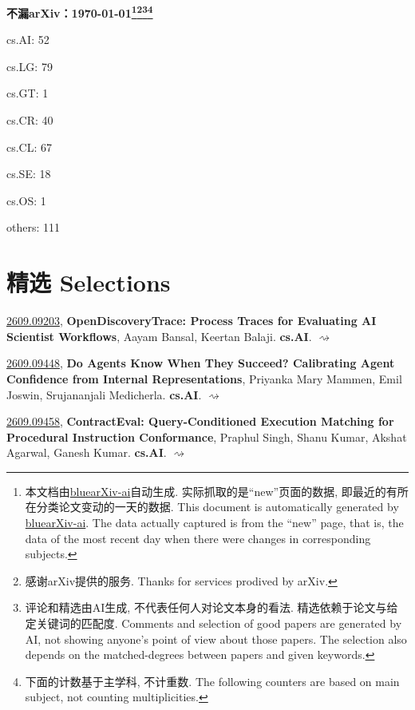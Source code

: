 \documentclass[9pt, a4paper]{article}
\theoremstyle{plain}
\theoremstyle{definition}
\theoremstyle{remark}
\newcommand{\arxiv}[3]{\href{https://arxiv.org/abs/#1}{#1}, \textbf{\textcolor{arxivblue}{#2}}, #3. }
\begin{document}
\begin{center}
    \Huge\textbf{不漏arXiv：\today \footnote{本文档由\href{https://github.com/vegetablefj/bluearXiv-ai}{bluearXiv-ai}自动生成. 实际抓取的是``new''页面的数据, 即最近的有所在分类论文变动的一天的数据. This document is automatically generated by \href{https://github.com/vegetablefj/bluearXiv-ai}{bluearXiv-ai}. The data actually captured is from the ``new'' page, that is, the data of the most recent day when there were changes in corresponding subjects.}\footnote{感谢arXiv提供的服务. Thanks for services prodived by arXiv.}\footnote{评论和精选由AI生成, 不代表任何人对论文本身的看法. 精选依赖于论文与给定关键词的匹配度. Comments and selection of good papers are generated by AI, not showing anyone's point of view about those papers. The selection also depends on the matched-degrees between papers and given keywords.}\footnote{下面的计数基于主学科, 不计重数. The following counters are based on main subject, not counting multiplicities.}} 
\end{center}

\begin{center}
cs.AI: 52

cs.LG: 79

cs.GT: 1

cs.CR: 40

cs.CL: 67

cs.SE: 18

cs.OS: 1

others: 111

\end{center}

\setcounter{section}{-1}
\section{精选 Selections}
\arxiv{2609.09203}{OpenDiscoveryTrace: Process Traces for Evaluating AI Scientist Workflows}{Aayam Bansal, Keertan Balaji}\textbf{cs.AI}. \hyperlink{2609.09203}{$\rightsquigarrow$}

\arxiv{2609.09448}{Do Agents Know When They Succeed? Calibrating Agent Confidence from Internal Representations}{Priyanka Mary Mammen, Emil Joswin, Srujananjali Medicherla}\textbf{cs.AI}. \hyperlink{2609.09448}{$\rightsquigarrow$}

\arxiv{2609.09458}{ContractEval: Query-Conditioned Execution Matching for Procedural Instruction Conformance}{Praphul Singh, Shanu Kumar, Akshat Agarwal, Ganesh Kumar}\textbf{cs.AI}. \hyperlink{2609.09458}{$\rightsquigarrow$}
\end{document}
